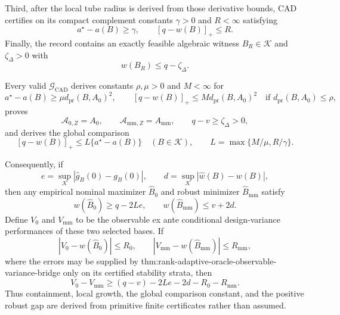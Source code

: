 Third, after the local tube radius is derived from those derivative bounds, CAD certifies on its compact complement constants \(\gamma>0\) and \(R<\infty\) satisfying
\[
a^\star-a(B)\ge\gamma,
\qquad [q-w(B)]_+\le R.
\tag{G2}
\]
Finally, the record contains an exactly feasible algebraic witness \(B_R\in\mathcal K\) and \(\zeta_\Delta>0\) with
\[
w(B_R)\le q-\zeta_\Delta.
\tag{G3}
\]

Every valid \(\mathscr G_{\mathrm{CAD}}\) derives constants \(\rho,\mu>0\) and \(M<\infty\) for
\[
a^\star-a(B)\ge\mu d_{\mathrm{pr}}(B,A_0)^2,
\qquad
[q-w(B)]_+\le M d_{\mathrm{pr}}(B,A_0)^2
\quad\text{if }d_{\mathrm{pr}}(B,A_0)\le\rho,
\tag{G4}
\]
proves
\[
\mathcal A_{0,Z}=A_0,
\qquad \mathcal A_{\mathrm{mm},Z}=A_{\mathrm{mm}},
\qquad q-v\ge\zeta_\Delta>0,
\tag{G5}
\]
and derives the global comparison
\[
[q-w(B)]_+
\le L\{a^\star-a(B)\}
\quad(B\in\mathcal K),
\qquad L=\max\{M/\mu,R/\gamma\}.
\tag{G6}
\]

Consequently, if
\[
e=\sup_{\mathcal K}|\widehat g_B(0)-g_B(0)|,
\qquad d=\sup_{\mathcal K}|\widehat w(B)-w(B)|,
\]
then any empirical nominal maximizer \(\widehat B_0\) and robust minimizer \(\widehat B_{\mathrm{mm}}\) satisfy
\[
w(\widehat B_0)\ge q-2Le,
\qquad w(\widehat B_{\mathrm{mm}})\le v+2d.
\]
Define \(V_0\) and \(V_{\mathrm{mm}}\) to be the observable ex ante conditional design-variance performances of these two selected bases.  If
\[
|V_0-w(\widehat B_0)|\le R_0,
\qquad
|V_{\mathrm{mm}}-w(\widehat B_{\mathrm{mm}})|\le R_{\mathrm{mm}},
\]
where the errors may be supplied by thm:rank-adaptive-oracle-observable-variance-bridge only on its certified stability strata, then
\[
V_0-V_{\mathrm{mm}}
\ge(q-v)-2Le-2d-R_0-R_{\mathrm{mm}}.
\tag{G7}
\]
Thus containment, local growth, the global comparison constant, and the positive robust gap are derived from primitive finite certificates rather than assumed.